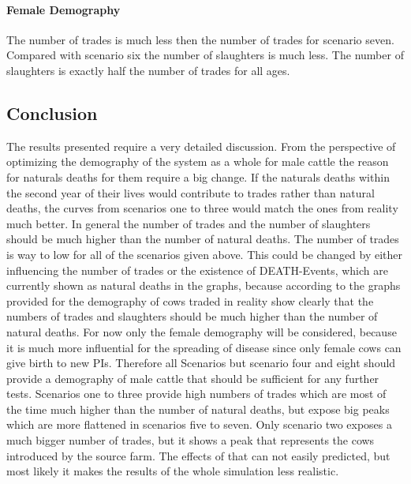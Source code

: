 \paragraph{Female Demography}
The number of trades is much less then the number of trades for scenario seven. Compared with scenario six the number of slaughters is much less. The number of slaughters is exactly half the number of trades for all ages. 

\subsection{Conclusion}
The results presented require a very detailed discussion. From the perspective of optimizing the demography of the system as a whole for male cattle the reason for naturals deaths for them require a big change. If the naturals deaths within the second year of their lives would contribute to trades rather than natural deaths, the curves from scenarios one to three would match the ones from reality much better.
In general the number of trades and the number of slaughters should be much higher than the number of natural deaths. The number of trades is way to low for all of the scenarios given above. This could be changed by either influencing the number of trades or the existence of DEATH-Events, which are currently shown as natural deaths in the graphs, because according to the graphs provided for the demography of cows traded in reality show clearly that the numbers of trades and slaughters should be much higher than the number of natural deaths. 
For now only the female demography will be considered, because it is much more influential for the spreading of disease since only female cows can give birth to new PIs. Therefore all Scenarios but scenario four and eight should provide a demography of male cattle that should be sufficient for any further tests. Scenarios one to three provide high numbers of trades which are most of the time much higher than the number of natural deaths, but expose big peaks which are more flattened in scenarios five to seven. Only scenario two exposes a much bigger number of trades, but it shows a peak that represents the cows introduced by the source farm. The effects of that can not easily predicted, but most likely it makes the results of the whole simulation less realistic. 

